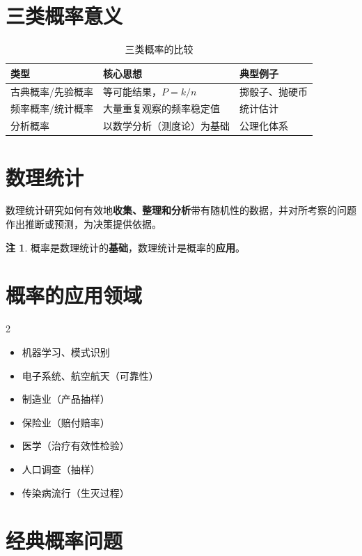 \documentclass[11pt,a4paper]{report}
\theoremstyle{definition}
\newtheorem{note}{注}[chapter]
\begin{document}
\section{三类概率意义}
\begin{table}[htbp]
\centering
\caption{三类概率的比较}
\begin{tabular}{@{}lll@{}}
\toprule
\textbf{类型} & \textbf{核心思想} & \textbf{典型例子} \\
\midrule
古典概率/先验概率 & 等可能结果，$P = k/n$ & 掷骰子、抛硬币 \\
频率概率/统计概率 & 大量重复观察的频率稳定值 & 统计估计 \\
分析概率 & 以数学分析（测度论）为基础 & 公理化体系 \\
\bottomrule
\end{tabular}
\end{table}

\section{数理统计}
数理统计研究如何有效地\textbf{收集、整理和分析}带有随机性的数据，并对所考察的问题作出推断或预测，为决策提供依据。

\begin{note}
概率是数理统计的\textbf{基础}，数理统计是概率的\textbf{应用}。
\end{note}

\section{概率的应用领域}
\begin{multicols}{2}
\begin{itemize}[leftmargin=1em,itemsep=0pt]
    \item 机器学习、模式识别
    \item 电子系统、航空航天（可靠性）
    \item 制造业（产品抽样）
    \item 保险业（赔付赔率）
    \item 医学（治疗有效性检验）
    \item 人口调查（抽样）
    \item 传染病流行（生灭过程）
\end{itemize}
\end{multicols}

\section{经典概率问题}
\end{document}
